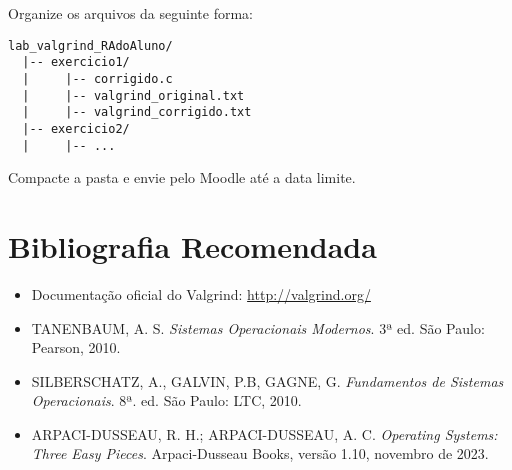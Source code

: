 \documentclass[11pt,a4paper]{article}
\begin{document}
\begin{tcolorbox}[colback=lightblue!20, colframe=mackblue, title=\emoji{light-bulb} Formato de Entrega]
Organize os arquivos da seguinte forma:
\begin{verbatim}
lab_valgrind_RAdoAluno/
  |-- exercicio1/
  |     |-- corrigido.c
  |     |-- valgrind_original.txt
  |     |-- valgrind_corrigido.txt
  |-- exercicio2/
  |     |-- ...
\end{verbatim}
Compacte a pasta e envie pelo Moodle até a data limite.
\end{tcolorbox}

\section{Bibliografia Recomendada}

\begin{itemize}
    \item Documentação oficial do Valgrind: \url{http://valgrind.org/}
    \item TANENBAUM, A. S. \textit{Sistemas Operacionais Modernos}. 3ª ed. São Paulo: Pearson, 2010.
    \item SILBERSCHATZ, A., GALVIN, P.B, GAGNE, G. \textit{Fundamentos de Sistemas Operacionais}. 8ª. ed. São Paulo: LTC, 2010.
    \item ARPACI-DUSSEAU, R. H.; ARPACI-DUSSEAU, A. C. \textit{Operating Systems: Three Easy Pieces}. Arpaci-Dusseau Books, versão 1.10, novembro de 2023.
\end{itemize}
\end{document}
